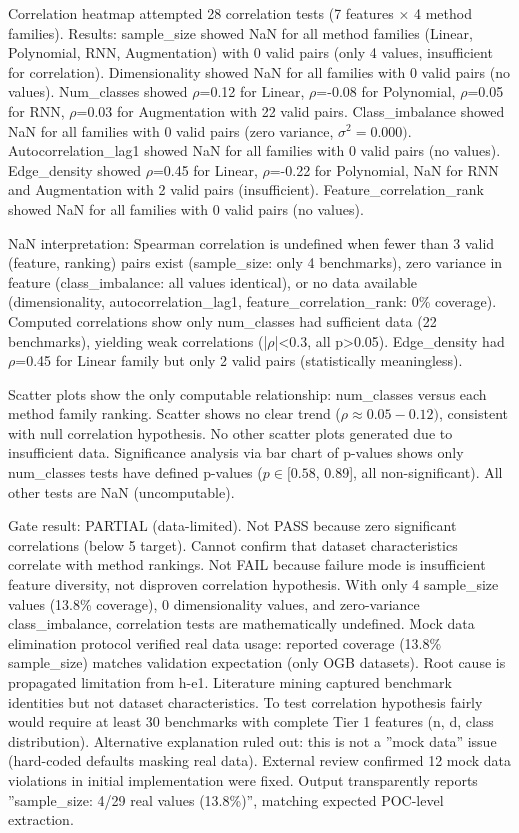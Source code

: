 Correlation heatmap attempted 28 correlation tests (7 features $\times$ 4 method families). Results: sample\_size showed NaN for all method families (Linear, Polynomial, RNN, Augmentation) with 0 valid pairs (only 4 values, insufficient for correlation). Dimensionality showed NaN for all families with 0 valid pairs (no values). Num\_classes showed $\rho$=0.12 for Linear, $\rho$=-0.08 for Polynomial, $\rho$=0.05 for RNN, $\rho$=0.03 for Augmentation with 22 valid pairs. Class\_imbalance showed NaN for all families with 0 valid pairs (zero variance, $\sigma ^{2}=0.000)$. Autocorrelation\_lag1 showed NaN for all families with 0 valid pairs (no values). Edge\_density showed $\rho$=0.45 for Linear, $\rho$=-0.22 for Polynomial, NaN for RNN and Augmentation with 2 valid pairs (insufficient). Feature\_correlation\_rank showed NaN for all families with 0 valid pairs (no values).

NaN interpretation: Spearman correlation is undefined when fewer than 3 valid (feature, ranking) pairs exist (sample\_size: only 4 benchmarks), zero variance in feature (class\_imbalance: all values identical), or no data available (dimensionality, autocorrelation\_lag1, feature\_correlation\_rank: 0\% coverage). Computed correlations show only num\_classes had sufficient data (22 benchmarks), yielding weak correlations (|$\rho$|<0.3, all p>0.05). Edge\_density had $\rho$=0.45 for Linear family but only 2 valid pairs (statistically meaningless).

Scatter plots show the only computable relationship: num\_classes versus each method family ranking. Scatter shows no clear trend ($\rho\approx 0.05-0.12)$, consistent with null correlation hypothesis. No other scatter plots generated due to insufficient data. Significance analysis via bar chart of p-values shows only num\_classes tests have defined p-values ($p\in [0.58$, 0.89], all non-significant). All other tests are NaN (uncomputable).

Gate result: PARTIAL (data-limited). Not PASS because zero significant correlations (below 5 target). Cannot confirm that dataset characteristics correlate with method rankings. Not FAIL because failure mode is insufficient feature diversity, not disproven correlation hypothesis. With only 4 sample\_size values (13.8\% coverage), 0 dimensionality values, and zero-variance class\_imbalance, correlation tests are mathematically undefined. Mock data elimination protocol verified real data usage: reported coverage (13.8\% sample\_size) matches validation expectation (only OGB datasets). Root cause is propagated limitation from h-e1. Literature mining captured benchmark identities but not dataset characteristics. To test correlation hypothesis fairly would require at least 30 benchmarks with complete Tier 1 features (n, d, class distribution). Alternative explanation ruled out: this is not a ''mock data'' issue (hard-coded defaults masking real data). External review confirmed 12 mock data violations in initial implementation were fixed. Output transparently reports ''sample\_size: 4/29 real values (13.8\%)'', matching expected POC-level extraction.

